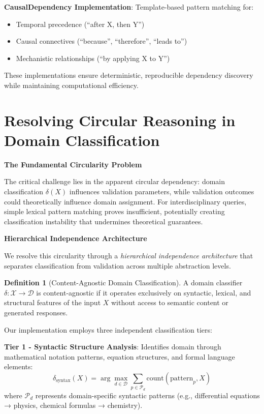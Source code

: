 \documentclass{uai2026} %
\theoremstyle{remark}
\theoremstyle{plain}
\theoremstyle{definition}
\newtheorem{definition}[theorem]{Definition}
\begin{document}
\textbf{CausalDependency Implementation}:
Template-based pattern matching for:
\begin{itemize}
\item Temporal precedence (``after X, then Y'')
\item Causal connectives (``because'', ``therefore'', ``leads to'')
\item Mechanistic relationships (``by applying X to Y'')
\end{itemize}

These implementations ensure deterministic, reproducible dependency discovery while maintaining computational efficiency.


\section{Resolving Circular Reasoning in Domain Classification}
\label{app:circular-resolution}

\textbf{The Fundamental Circularity Problem}

The critical challenge lies in the apparent circular dependency: domain classification $\delta(X)$ influences validation parameters, while validation outcomes could theoretically influence domain assignment. For interdisciplinary queries, simple lexical pattern matching proves insufficient, potentially creating classification instability that undermines theoretical guarantees.

\textbf{Hierarchical Independence Architecture}

We resolve this circularity through a \emph{hierarchical independence architecture} that separates classification from validation across multiple abstraction levels.

\begin{definition}[Content-Agnostic Domain Classification]
\label{def:content-agnostic}
A domain classifier $\delta: \mathcal{X} \rightarrow \mathcal{D}$ is content-agnostic if it operates exclusively on syntactic, lexical, and structural features of the input $X$ without access to semantic content or generated responses.
\end{definition}

Our implementation employs three independent classification tiers:

\textbf{Tier 1 - Syntactic Structure Analysis}: Identifies domain through mathematical notation patterns, equation structures, and formal language elements:
\begin{equation}
\delta_{\text{syntax}}(X) = \arg\max_{d \in \mathcal{D}} \sum_{p \in \mathcal{P}_d} \text{count}(\text{pattern}_p, X)
\end{equation}
where $\mathcal{P}_d$ represents domain-specific syntactic patterns (e.g., differential equations → physics, chemical formulas → chemistry).
\end{document}
